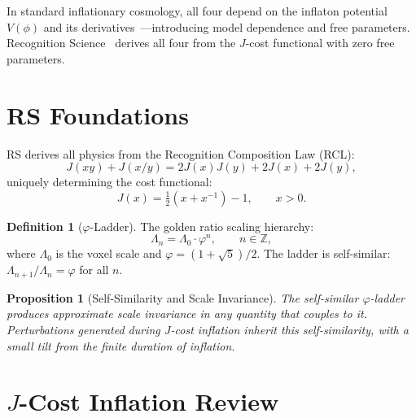 \documentclass[12pt,a4paper]{article}
\newtheorem{proposition}[theorem]{Proposition}
\theoremstyle{definition}
\newtheorem{definition}[theorem]{Definition}
\theoremstyle{remark}
\begin{document}
In standard inflationary cosmology, all four depend on the
inflaton potential $V(\phi)$ and its
derivatives~\cite{Baumann2009}---introducing model
dependence and free parameters.  Recognition Science~\cite{RS_Axioms} derives all four from the
$J$-cost functional with zero free parameters.

\section{RS Foundations}
\label{sec:foundations}

RS derives all physics from the Recognition Composition Law
(RCL):
\begin{equation}
  J(xy) + J(x/y) = 2J(x)J(y) + 2J(x) + 2J(y),
  \label{eq:RCL}
\end{equation}
uniquely determining the cost functional:
\begin{equation}
  J(x) = \tfrac{1}{2}(x + x^{-1}) - 1, \qquad x > 0.
  \label{eq:cost}
\end{equation}

\begin{definition}[$\varphi$-Ladder]
\label{def:ladder}
The golden ratio scaling hierarchy:
\begin{equation}
  \Lambda_n = \Lambda_0 \cdot \varphi^n, \qquad n \in
  \mathbb{Z},
\end{equation}
where $\Lambda_0$ is the voxel scale and
$\varphi = (1 + \sqrt{5})/2$.  The ladder is self-similar:
$\Lambda_{n+1}/\Lambda_n = \varphi$ for all $n$.
\end{definition}

\begin{proposition}[Self-Similarity and Scale Invariance]
\label{prop:self-sim}
The self-similar $\varphi$-ladder produces approximate
scale invariance in any quantity that couples to it.
Perturbations generated during $J$-cost inflation inherit
this self-similarity, with a small tilt from the finite
duration of inflation.
\end{proposition}

\section{$J$-Cost Inflation Review}
\label{sec:inflation}
\end{document}
